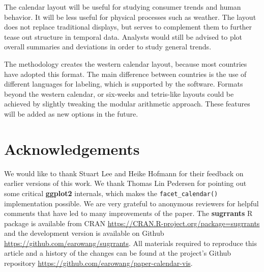 \documentclass[12pt]{article}
\begin{document}
The calendar layout will be useful for studying consumer trends and human behavior. It will be less useful for physical processes such as weather. The layout does not replace traditional displays, but serves to complement them to further tease out structure in temporal data. Analysts would still be advised to plot overall summaries and deviations in order to study general trends.

The methodology creates the western calendar layout, because most countries have adopted this format. The main difference between countries is the use of different languages for labeling, which is supported by the software. Formats beyond the western calendar, or six-weeks and tetris-like layouts could be achieved by slightly tweaking the modular arithmetic approach. These features will be added as new options in the future.

\hypertarget{acknowledgements}{%
\section*{Acknowledgements}\label{acknowledgements}}

We would like to thank Stuart Lee and Heike Hofmann for their feedback on earlier versions of this work. We thank Thomas Lin Pedersen for pointing out some critical \textbf{ggplot2} internals, which makes the \texttt{facet\_calendar()} implementation possible. We are very grateful to anonymous reviewers for helpful comments that have led to many improvements of the paper. The \textbf{sugrrants} R package is available from CRAN \url{https://CRAN.R-project.org/package=sugrrants} and the development version is available on Github \url{https://github.com/earowang/sugrrants}. All materials required to reproduce this article and a history of the changes can be found at the project's Github repository \url{https://github.com/earowang/paper-calendar-vis}.



\end{document}
